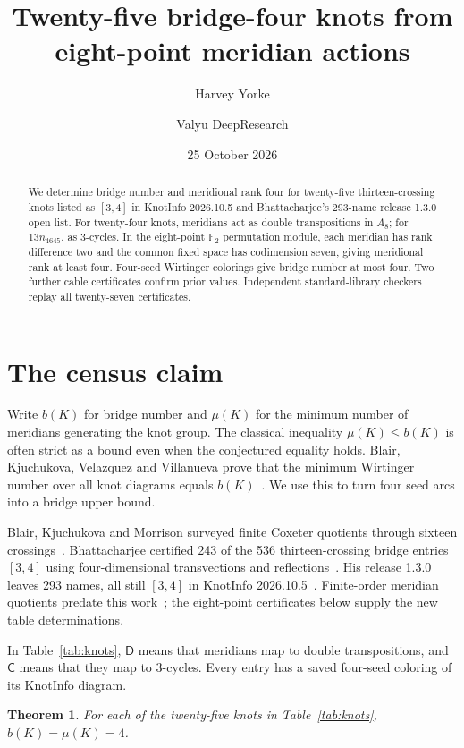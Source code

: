 \documentclass[11pt]{amsart}
\title{Twenty-five bridge-four knots from eight-point meridian actions}
\author{Harvey Yorke}
\author{Valyu DeepResearch}
\date{25 October 2026}
\newtheorem{theorem}{Theorem}[section]
\theoremstyle{remark}
\newcommand{\F}{\mathbb F}
\begin{document}
\raggedbottom
\begin{abstract}
We determine bridge number and meridional rank four for twenty-five thirteen-crossing knots listed as $[3,4]$ in KnotInfo 2026.10.5 and Bhattacharjee's 293-name release 1.3.0 open list. For twenty-four knots, meridians act as double transpositions in $A_8$; for $13n_{4645}$, as $3$-cycles. In the eight-point $\F_2$ permutation module, each meridian has rank difference two and the common fixed space has codimension seven, giving meridional rank at least four. Four-seed Wirtinger colorings give bridge number at most four. Two further cable certificates confirm prior values. Independent standard-library checkers replay all twenty-seven certificates.
\end{abstract}
\maketitle

\section{The census claim}

Write $b(K)$ for bridge number and $\mu(K)$ for the minimum number of meridians generating the knot group. The classical inequality $\mu(K)\le b(K)$ is often strict as a bound even when the conjectured equality holds. Blair, Kjuchukova, Velazquez and Villanueva prove that the minimum Wirtinger number over all knot diagrams equals $b(K)$~\cite{BKVV}. We use this to turn four seed arcs into a bridge upper bound.

Blair, Kjuchukova and Morrison surveyed finite Coxeter quotients through sixteen crossings~\cite{BKM}. Bhattacharjee certified 243 of the 536 thirteen-crossing bridge entries $[3,4]$ using four-dimensional transvections and reflections~\cite{Bhattacharjee}. His release 1.3.0 leaves 293 names, all still $[3,4]$ in KnotInfo 2026.10.5~\cite{KnotInfo}. Finite-order meridian quotients predate this work~\cite{JosephPongtanapaisan}; the eight-point certificates below supply the new table determinations.

In Table~\ref{tab:knots}, $\mathsf D$ means that meridians map to double transpositions, and $\mathsf C$ means that they map to $3$-cycles. Every entry has a saved four-seed coloring of its KnotInfo diagram.

\begin{theorem}\label{thm:census}
For each of the twenty-five knots in Table~\ref{tab:knots}, $b(K)=\mu(K)=4$.
\end{theorem}
\end{document}
